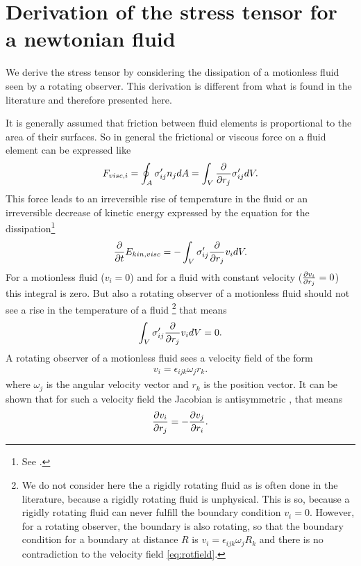 \chapter{Derivation of the stress tensor for a newtonian fluid}\label{stress}
We derive the stress tensor by considering the dissipation of a motionless
fluid seen by a rotating observer. This derivation is different from what
is found in the literature \citep[eg.][]{Greiner1991} and therefore presented
here.

It is generally assumed that friction between fluid elements is proportional
to the area of their surfaces. So in general the frictional or viscous force
on a fluid element can be expressed like
\begin{align}
F_{visc,i}= \oint_A \sigma'_{ij} n_j dA = \int_V \pd{r_j} \sigma'_{ij} dV.
\end{align}
This force leads to an irreversible rise of temperature in the fluid or an
irreversible
decrease of kinetic energy expressed by the equation for the
dissipation\footnote{See \citet{Landau1991}.}
\begin{align}
\pd{t} E_{kin,visc} = - \int_V \sigma'_{ij} \pd{r_j} v_i dV.
\end{align}
For a motionless fluid ($v_i=0$) and for a fluid with constant velocity 
($\ppd{r_j}{v_i} = 0$) this integral is zero. But also a rotating observer
of a motionless fluid should not see a rise in the temperature of a fluid
\footnote{We do not consider here the a rigidly rotating fluid as is often
done in the literature, because a rigidly rotating fluid is unphysical. This is
so, because a rigidly rotating fluid can never fulfill the
boundary condition $v_i=0$. However, for a rotating observer, the boundary
is also rotating, so that the boundary condition for a boundary at distance $R$
is
$v_i=\epsilon_{ijk}\omega_j R_k$ and there is no contradiction to the velocity 
field \eqref{eq:rotfield}.}
that means
\begin{align}
 \int_V \sigma'_{ij} \pd{r_j} v_i dV = 0 .\label{eq:nodiss}
\end{align}
A rotating observer of a motionless fluid sees a velocity field of the form
\begin{align}
v_i=\epsilon_{ijk}\omega_j r_k \label{eq:rotfield}.
\end{align}
where $\omega_j$ is the angular velocity vector and $r_k$ is the position
vector.
It can be shown that for such a velocity field the Jacobian is antisymmetric
\citep{Greiner1991}, that means
\begin{align}
\ppd{r_j}{v_i} = -\ppd{r_i}{v_j}.
\end{align}
